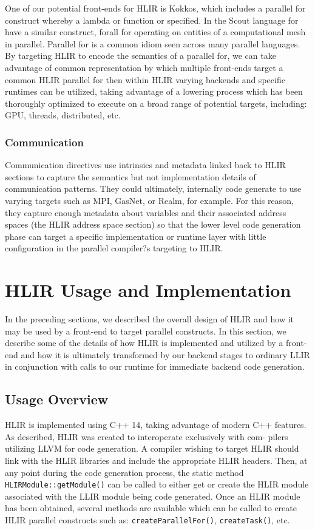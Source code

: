 \documentclass[12pt]{article}
\begin{document}
One of our potential front-ends for HLIR is Kokkos, which includes a parallel for construct whereby a lambda or function or specified. In the Scout language for have a similar construct, forall for operating on entities of a computational mesh in parallel. Parallel for is a common idiom seen across many parallel languages. By targeting HLIR to encode the semantics of a parallel for, we can take advantage of common representation by which multiple front-ends target a common HLIR parallel for then within HLIR varying backends and specific runtimes can be utilized, taking advantage of a lowering process which has been thoroughly optimized to execute on a broad range of potential targets, including: GPU, threads, distributed, etc.

\subsubsection{Communication}

Communication directives use intrinsics and metadata linked back to HLIR sections to capture the semantics but not implementation details of communication patterns. They could ultimately, internally code generate to use varying targets such as MPI, GasNet, or Realm, for example. For this reason, they capture enough metadata about variables and their associated address spaces (the HLIR address space section) so that the lower level code generation phase can target a specific implementation or runtime layer with little configuration in the parallel compiler?s targeting to HLIR.

\section{HLIR Usage and Implementation}

In the preceding sections, we described the overall design of HLIR and how it may be used by a front-end to target parallel constructs. In this section, we describe some of the details of how HLIR is implemented and utilized by a front-end and how it is ultimately transformed by our backend stages to ordinary LLIR in conjunction with calls to our runtime for immediate backend code generation.

\subsection{Usage Overview}

HLIR is implemented using C++ 14, taking advantage of modern C++ features. As described, HLIR was created to interoperate exclusively with com- pilers utilizing LLVM for code generation. A compiler wishing to target HLIR should link with the HLIR libraries and include the appropriate HLIR headers. Then, at any point during the code generation process, the static method {\tt HLIRModule::getModule()} can be called to either get or create the HLIR module associated with the LLIR module being code generated. Once an HLIR module has been obtained, several methods are available which can be called to create HLIR parallel constructs such as: {\tt createParallelFor()}, {\tt createTask()}, etc.
\end{document}
